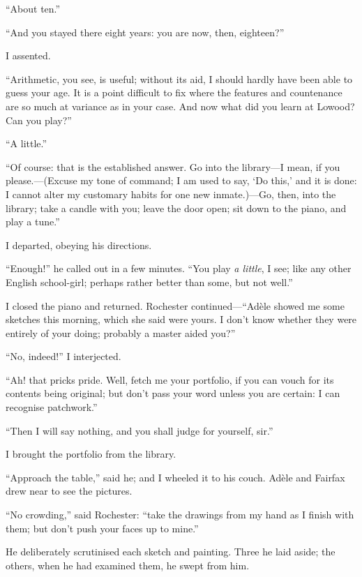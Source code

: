 \enquote{About ten.}

\enquote{And you stayed there eight years: you are now, then, eighteen?}

I assented.

\enquote{Arithmetic, you see, is useful; without its aid, I should
	hardly have been able to guess your age. It is a point difficult to fix
	where the features and countenance are so much at variance as in your
	case. And now what did you learn at Lowood? Can you play?}

\enquote{A little.}

\enquote{Of course: that is the established answer. Go into the
	library---I mean, if you please.---(Excuse my tone of command; I am used
	to say, \enquote{Do this,} and it is done: I cannot alter my customary
	habits for one new inmate.)---Go, then, into the library; take a candle
	with you; leave the door open; sit down to the piano, and play a tune.}

I departed, obeying his directions.

\enquote{Enough!} he called out in a few minutes. \enquote{You play \emph{a
		little}, I see; like any other English school-girl; perhaps rather
	better than some, but not well.}

I closed the piano and returned. \Mr{} Rochester
continued---\enquote{Adèle showed me some sketches this morning, which
	she said were yours. I don't know whether they were entirely of your
	doing; probably a master aided you?}

\enquote{No, indeed!} I interjected.

\enquote{Ah! that pricks pride. Well, fetch me your portfolio, if you
	can vouch for its contents being original; but don't pass your word
	unless you are certain: I can recognise patchwork.}

\enquote{Then I will say nothing, and you shall judge for yourself,
	sir.}

I brought the portfolio from the library.

\enquote{Approach the table,} said he; and I wheeled it to his couch.
Adèle and \Mrs{} Fairfax drew near to see the pictures.

\enquote{No crowding,} said \Mr{} Rochester: \enquote{take the drawings
	from my hand as I finish with them; but don't push your faces up to
	mine.}

He deliberately scrutinised each sketch and painting. Three he laid
aside; the others, when he had examined them, he swept from him.

